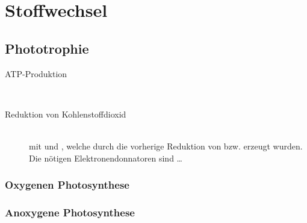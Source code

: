 \section{Stoffwechsel}
\subsection{Phototrophie}
\begin{description}
	\item[ATP-Produktion]	\hfill \\
	\item[Reduktion von Kohlenstoffdioxid]	\hfill	\\
		mit  und ,
		welche durch die vorherige Reduktion von  bzw.  erzeugt wurden.
		Die nötigen Elektronendonnatoren sind \ldots
\end{description}

\subsubsection{Oxygenen Photosynthese}

\subsubsection{Anoxygene Photosynthese}
